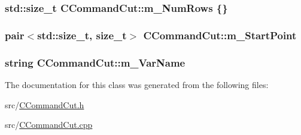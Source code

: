 \subsubsection[{\texorpdfstring{m\+\_\+\+Num\+Rows}{m_NumRows}}]{\setlength{\rightskip}{0pt plus 5cm}std\+::size\+\_\+t C\+Command\+Cut\+::m\+\_\+\+Num\+Rows \{\}\hspace{0.3cm}{\ttfamily [protected]}}\hypertarget{classCCommandCut_ae1021a795aa0ca34697021ed9c68ea33}{}\label{classCCommandCut_ae1021a795aa0ca34697021ed9c68ea33}
\subsubsection[{\texorpdfstring{m\+\_\+\+Start\+Point}{m_StartPoint}}]{\setlength{\rightskip}{0pt plus 5cm}pair$<$std\+::size\+\_\+t, size\+\_\+t$>$ C\+Command\+Cut\+::m\+\_\+\+Start\+Point\hspace{0.3cm}{\ttfamily [protected]}}\hypertarget{classCCommandCut_adbd994d2b9e2620042427235516b446b}{}\label{classCCommandCut_adbd994d2b9e2620042427235516b446b}
\subsubsection[{\texorpdfstring{m\+\_\+\+Var\+Name}{m_VarName}}]{\setlength{\rightskip}{0pt plus 5cm}string C\+Command\+Cut\+::m\+\_\+\+Var\+Name\hspace{0.3cm}{\ttfamily [protected]}}\hypertarget{classCCommandCut_aeb69b9b4f3e1c319de83c2753294e2db}{}\label{classCCommandCut_aeb69b9b4f3e1c319de83c2753294e2db}


The documentation for this class was generated from the following files\+:\begin{DoxyCompactItemize}
\item 
src/\hyperlink{CCommandCut_8h}{C\+Command\+Cut.\+h}\item 
src/\hyperlink{CCommandCut_8cpp}{C\+Command\+Cut.\+cpp}\end{DoxyCompactItemize}
